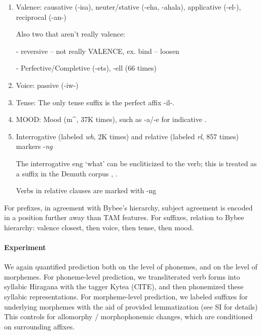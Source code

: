 \begin{enumerate}
    \item Valence: causative (-isa),  neuter/stative (-eha, -ahala), applicative (-el-), reciprocal (-an-)
    
    
    Also two that aren't really valence:
    
    - reversive \cite[]{doke1967textbook} -- not really VALENCE, ex. bind -- loosen
    
    -  Perfective/Completive (-ets), -ell (66 times) \cite[]{doke1967textbook}
    

    \item Voice: passive (-iw-)
    
    
    \item Tense: The only tense suffix is the perfect affix -il-.

     
    \item MOOD: Mood (m\^{}, 37K times), such as -a/-e for indicative \citep{demuth1992acquisition}.
    

    \item Interrogative (labeled \textit{wh}, 2K times) and relative (labeled \textit{rl}, 857 times) markers -\textit{ng}
    
    The interrogative eng `what' can be encliticized to the verb; this is treated as a suffix in the Demuth corpus \cite[p. 168]{guma1971handbook}, \cite[, 320]{doke1967textbook}.
    
    Verbs in relative clauses are marked with -ng \cite[, 793]{doke1967textbook}

\end{enumerate}



For prefixes, in agreement with Bybee's hierarchy, subject agreement is encoded in a position further away than TAM features.
For suffixes, relation to Bybee hierarchy: valence closest, then voice, then tense, then mood.




\paragraph{Experiment}
We again quantified prediction both on the level of phonemes, and on the level of morphemes.
For phoneme-level prediction, we transliterated verb forms into syllabic Hiragana with the tagger Kytea (CITE), and then phonemized these syllabic representations.
For morpheme-level prediction, we labeled suffixes for underlying morphemes with the aid of provided lemmatization (see SI for details)
This controls for allomorphy / morphophonemic changes, which are conditioned on surrounding affixes.

